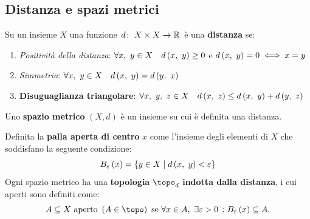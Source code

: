 \subsection{Distanza e spazi metrici}
\begin{define}
	Su un insieme $X$ una funzione $\funz{d}{X\times X}{\realset}$ è una \textbf{distanza} se:
	\begin{enumerate}
		\item \textit{Positività della distanza}: $\forall x,\ y\in X\quad d\left(x,\ y\right)\geq 0$ e $d\left(x,\ y\right)=0\iff x=y$
		\item \textit{Simmetria}: $\forall x,\ y\in X\quad d\left(x,\ y\right)=d\left(y,\ x\right)$
		\item \textbf{Disuguaglianza triangolare}: $\forall x,\ y,\ z\in X\quad d\left(x,\ z\right)\leq d\left(x,\ y\right)+d\left(y,\ z\right)$
	\end{enumerate}
\end{define}
\begin{define}
	Uno \textbf{spazio metrico} $\left(X, d\right)$ è un insieme su cui è definita una distanza.
\end{define}
\begin{define}
	Definita la \textbf{palla aperta di centro} $x$ come l'insieme degli elementi di $X$ che soddisfano la seguente condizione:
	\begin{equation}
		B_{\varepsilon}\left(x\right)=\left\{y\in X\mid d\left(x,\ y\right)<\varepsilon\right\}
	\end{equation}
	Ogni spazio metrico ha una \textbf{topologia} $\topo_d$ \textbf{indotta dalla distanza}, i cui aperti sono definiti come:
	\begin{equation*}
		A\subseteq X \text{ aperto } \left(A\in\topo\right) \text{ se } \forall x\in A,\ \exists \epsilon>0\ \colon B_{\epsilon}\left(x\right)\subseteq A.
	\end{equation*}
\end{define}
